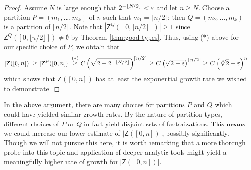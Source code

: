 \begin{proof}
Assume $N$ is large enough that $2^{-\lfloor N/2 \rfloor} < \varepsilon$ and let $n\ge N$.
Choose a partition $P = (m_1,\dots, m_k)$ of $n$ such that $m_1 = \lceil n/2 \rceil$; then $Q = (m_2,\dots, m_k)$ is a partition of $\lfloor n/2 \rfloor$.
Note that $|\mathsf{Z}^Q([0,\lfloor n/2 \rfloor])|\ge1$ since $\mathsf{Z}^Q([0,\lfloor n/2\rfloor])\neq \emptyset$ by Theorem \ref{thm:good types}.
Thus, using ($*$) above for our specific choice of $P$, we obtain that
\[ |\mathsf{Z}([0,n])| 
\ge |\mathsf{Z}^P([0,n])| 
\overset{(*)}{\ge} C \left(\sqrt{2-2^{-\lfloor N/2 \rfloor}}\right)^{\lceil n/2 \rceil}
\ge C \left( \sqrt{2 -\varepsilon} \right)^{\lceil n/2 \rceil}
\ge C\left(\sqrt[4]{2}-\varepsilon\right)^n
\]
which shows that $\mathsf{Z}([0,n])$ has at least the exponential growth rate we wished to demonstrate.
\end{proof}

In the above argument, there are many choices for partitions $P$ and $Q$ which could have yielded similar growth rates.
By the nature of partition types, different choices of $P$ or $Q$ in fact yield disjoint sets of factorizations.
This means we could increase our lower estimate of $|\mathsf{Z}([0,n])|$, possibly significantly.
Though we will not pursue this here, it is worth remarking that a more thorough probe into this topic and application of deeper analytic tools might yield a meaningfully higher rate of growth for $|\mathsf{Z}([0,n])|$.

